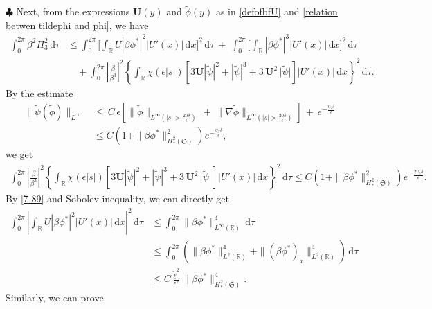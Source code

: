 \documentclass[10pt, reqno]{amsart}
\numberwithin{equation}{section}
\theoremstyle{definition}
\def\lf{\left}
\def\ri{\right}
\begin{document}
{\smallskip\noindent$\clubsuit$
Next, from the expressions $\mathbf{U}(y)$ and $\tilde\phi(y)$ as in \eqref{defofbfU} and \eqref{relation betwen tildephi and phi}, we have
\begin{align*}
 \int_0^{2\pi} \beta^2\Pi_3^2 \,{\mathrm d}\tau
& \leq
\int_0^{2\pi} \Bigg[\int_{{\mathbb R}} U |\beta\phi^*|^2 |U'(x)| \,{\mathrm d}x\Bigg]^2 \,{\mathrm d}\tau
\ +\
\int_0^{2\pi} \Bigg[\int_{{\mathbb R}} |\beta\phi^*|^3 |U'(x)| \,{\mathrm d}x \Bigg]^2 \,{\mathrm d}\tau
\nonumber\\[2mm]
& \quad + \int_0^{2\pi}\left|\frac{\beta}{\beta^3}\right|^2\left\{\int_{{\mathbb R}}\chi(\epsilon|s|)\left[3\mathbf{U} |{\tilde\psi}|^2+|{\tilde\psi}|^3 +3\, \mathbf{U}^2 \, \big|{\tilde\psi}\big|\right] |U'(x)| \,{\mathrm d}x \right\}^2\,{\mathrm d}\tau.
\end{align*}
By the estimate
\begin{align*}
\|{\tilde\psi}({\tilde\phi})\|_{L^{\infty}}\, & \leq \, C\, \epsilon \lf[\|\tilde\phi\|_{L^{\infty}(|s|>\frac{20\delta}{\epsilon})}\,+\, \|\nabla \tilde\phi\|_{L^{\infty}(|s|>\frac{20\delta}{\epsilon})}\ri]\,+\,
e^{-\frac{ \upsilon_2 \delta}{\epsilon}}
\nonumber\\[2mm]
& \leq
C\left( 1 + \|\beta \phi^*\|_{H^2_*(\mathfrak S)}^2 \right) e^{-\frac{ \upsilon_3 \delta}{\epsilon}},
\end{align*}
we get
\begin{align*}
 \int_0^{2\pi} \left|\frac{\beta}{\beta^3}\right|^2 \left\{\int_{{\mathbb R}}\chi(\epsilon|s|)\left[3\mathbf{U} |{\tilde\psi}|^2+|{\tilde\psi}|^3 +3\, \mathbf{U}^2 \, \big|{\tilde\psi}\big|\right] |U'(x)| \,{\mathrm d}x \right\}^2\,{\mathrm d}\tau
 \leq
 C\left( 1 + \|\beta \phi^*\|_{H^2_*(\mathfrak S)}^2 \right) e^{-\frac{2\upsilon_3 \delta}{\epsilon}}.
\end{align*}
By \eqref{7-89} and  Sobolev inequality, we can directly get
\begin{align} \label{phisuqareestimate}
\int_0^{2\pi} \left|\int_{{\mathbb R}} U |\beta\phi^*|^2 |U'(x)| \,{\mathrm d}x\right|^2 \,{\mathrm d}\tau
&\leq \int_0^{2\pi} \|\beta\phi^* \|_{L^{\infty}(\mathbb R)}^4 \,{\mathrm d}\tau
\nonumber\\[2mm]
&\leq \int_0^{2\pi} \left(\|\beta\phi^* \|_{L^{2}(\mathbb R)}^4+\|(\beta\phi^*)_{x} \|_{L^{2}(\mathbb R)}^4\right) \,{\mathrm d}\tau
\nonumber\\[2mm]
&\leq C \frac{{\tilde\ell}^2}{\epsilon^2}\|\beta\phi^*\|^4_{H^2_*(\mathfrak S)}.
\end{align}
 Similarly, we can prove
}
\end{document}
